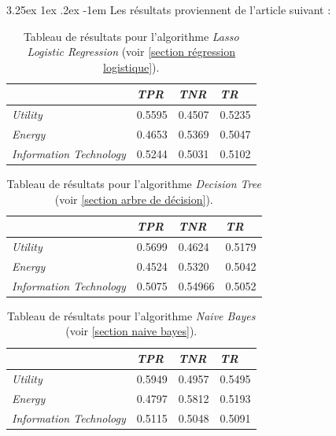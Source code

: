 \documentclass[a4paper, 11pt]{article}
\makeatletter
\newcounter{subsubsubsection}[subsubsection]
\renewcommand\paragraph{\@startsection{paragraph}{5}{\z@}%
  {3.25ex \@plus1ex \@minus.2ex}%
  {-1em}%
  {\normalfont\normalsize\bfseries}}
\makeatother
\begin{document}
\paragraph{}
Les résultats proviennent de l'article suivant \cite{machine_learning_automated_trading} :

\begin{table}[h!]
	\centering
\begin{tabular}{|l|l|l|l|}
	\hline
	\ & \textit{TPR} & \textit{TNR} & \textit{TR}\\
	\hline
	\textit{Utility} & 0.5595 & 0.4507 & 0.5235 \\
	\hline
	\textit{Energy} & 0.4653 & 0.5369 & 0.5047\\
	\hline
	\textit{Information Technology} & 0.5244 & 0.5031 & 0.5102\\
	\hline
\end{tabular}
\caption[]{Tableau de résultats pour l'algorithme \textit{Lasso Logistic Regression} (voir \ref{section régression logistique}).}
\end{table}



\begin{table}[h!]
	\centering
\begin{tabular}{|l|l|l|l|}
	\hline
	\ & \textit{TPR} & \textit{TNR} & \textit{TR}\\
	\hline
	\textit{Utility} & 0.5699 & 0.4624 & 0.5179 \\
	\hline
	\textit{Energy} & 0.4524 & 0.5320 & 0.5042\\
	\hline
	\textit{Information Technology} & 0.5075 & 0.54966 & 0.5052\\
	\hline
\end{tabular}
\caption[]{Tableau de résultats pour l'algorithme \textit{Decision Tree} (voir \ref{section arbre de décision}).}
\end{table}



\begin{table}[h!]
	\centering
\begin{tabular}{|l|l|l|l|}
	\hline
	\ & \textit{TPR} & \textit{TNR} & \textit{TR}\\
	\hline
	\textit{Utility} & 0.5949 & 0.4957 & 0.5495 \\
	\hline
	\textit{Energy} & 0.4797 & 0.5812 & 0.5193\\
	\hline
	\textit{Information Technology} & 0.5115 & 0.5048 & 0.5091\\
	\hline
\end{tabular}
\caption[]{Tableau de résultats pour l'algorithme \textit{Naive Bayes} (voir \ref{section naive bayes}).}
\end{table}
\end{document}
